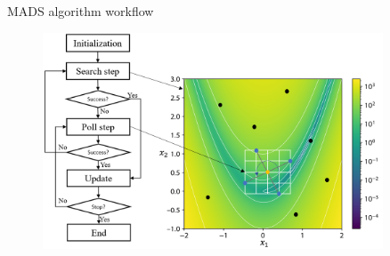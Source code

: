 \documentclass[8pt]{beamer}
\begin{document}
\begin{frame}{MADS algorithm workflow}
  \begin{center}
    \begin{figure}[H]
    \includegraphics[width=0.9\textwidth]
    {Figures/flow-chart.png}
    \end{figure}
    \end{center}
\end{frame}
\end{document}
